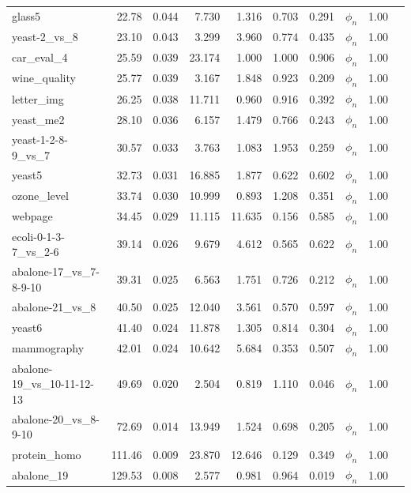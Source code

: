 \begin{longtable}{lrrrrrrrll}
    glass5 & 22.78 & 0.044 & 7.730 & 1.316 & 0.703 & 0.291 & $\phi_{n}$ & 1.00 \\
    yeast-2\_vs\_8 & 23.10 & 0.043 & 3.299 & 3.960 & 0.774 & 0.435 & $\phi_{n}$ & 1.00 \\
    car\_eval\_4 & 25.59 & 0.039 & 23.174 & 1.000 & 1.000 & 0.906 & $\phi_{n}$ & 1.00 \\
    wine\_quality & 25.77 & 0.039 & 3.167 & 1.848 & 0.923 & 0.209 & $\phi_{n}$ & 1.00 \\
    letter\_img & 26.25 & 0.038 & 11.711 & 0.960 & 0.916 & 0.392 & $\phi_{n}$ & 1.00 \\
    yeast\_me2 & 28.10 & 0.036 & 6.157 & 1.479 & 0.766 & 0.243 & $\phi_{n}$ & 1.00 \\
    yeast-1-2-8-9\_vs\_7 & 30.57 & 0.033 & 3.763 & 1.083 & 1.953 & 0.259 & $\phi_{n}$ & 1.00 \\
    yeast5 & 32.73 & 0.031 & 16.885 & 1.877 & 0.622 & 0.602 & $\phi_{n}$ & 1.00 \\
    ozone\_level & 33.74 & 0.030 & 10.999 & 0.893 & 1.208 & 0.351 & $\phi_{n}$ & 1.00 \\
    webpage & 34.45 & 0.029 & 11.115 & 11.635 & 0.156 & 0.585 & $\phi_{n}$ & 1.00 \\
    ecoli-0-1-3-7\_vs\_2-6 & 39.14 & 0.026 & 9.679 & 4.612 & 0.565 & 0.622 & $\phi_{n}$ & 1.00 \\
    abalone-17\_vs\_7-8-9-10 & 39.31 & 0.025 & 6.563 & 1.751 & 0.726 & 0.212 & $\phi_{n}$ & 1.00 \\
    abalone-21\_vs\_8 & 40.50 & 0.025 & 12.040 & 3.561 & 0.570 & 0.597 & $\phi_{n}$ & 1.00 \\
    yeast6 & 41.40 & 0.024 & 11.878 & 1.305 & 0.814 & 0.304 & $\phi_{n}$ & 1.00 \\
    mammography & 42.01 & 0.024 & 10.642 & 5.684 & 0.353 & 0.507 & $\phi_{n}$ & 1.00 \\
    abalone-19\_vs\_10-11-12-13 & 49.69 & 0.020 & 2.504 & 0.819 & 1.110 & 0.046 & $\phi_{n}$ & 1.00 \\
    abalone-20\_vs\_8-9-10 & 72.69 & 0.014 & 13.949 & 1.524 & 0.698 & 0.205 & $\phi_{n}$ & 1.00 \\
    protein\_homo & 111.46 & 0.009 & 23.870 & 12.646 & 0.129 & 0.349 & $\phi_{n}$ & 1.00 \\
    abalone\_19 & 129.53 & 0.008 & 2.577 & 0.981 & 0.964 & 0.019 & $\phi_{n}$ & 1.00 \\
\end{longtable}